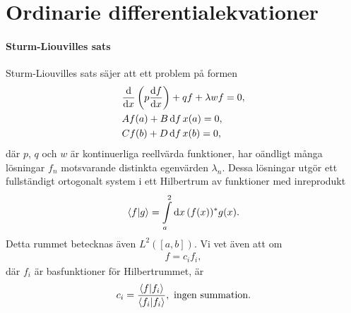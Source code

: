 \section{Ordinarie differentialekvationer}

\paragraph{Sturm-Liouvilles sats}
Sturm-Liouvilles sats säjer att ett problem på formen
\begin{align*}
	&\dv{x}\left(p\dv{f}{x}\right) + qf + \lambda wf = 0, \\
	&Af(a) + B\deval{f}{x}{a} = 0, \\
	&Cf(b) + D\deval{f}{x}{b} = 0,
\end{align*}
där $p$, $q$ och $w$ är kontinuerliga reellvärda funktioner, har oändligt många lösningar $f_{n}$ motsvarande distinkta egenvärden $\lambda_{n}$. Dessa lösningar utgör ett fullständigt ortogonalt system i ett Hilbertrum av funktioner med inreprodukt
\begin{align*}
	\inprod{f}{g} = \inteval{a}{b}{x}{\cc{(f(x))}g(x)}.
\end{align*}
Detta rummet betecknas även $L^{2}([a, b])$. Vi vet även att om
\begin{align*}
	f = c_{i}f_{i},
\end{align*}
där $f_{i}$ är basfunktioner för Hilbertrummet, är
\begin{align*}
	c_{i} = \frac{\inprod{f}{f_{i}}}{\inprod{f_{i}}{f_{i}}}, \text{ ingen summation.}
\end{align*}